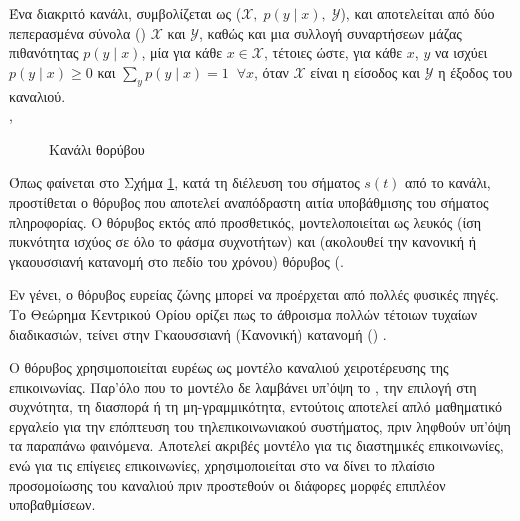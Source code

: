 \begin{definition}
Ένα διακριτό κανάλι, συμβολίζεται ως ($\mathcal{X},\;p(y\mid{x}),\;\mathcal{Y}$), και αποτελείται από δύο πεπερασμένα σύνολα () $\mathcal{X}$ και $\mathcal{Y}$, καθώς και μια συλλογή συναρτήσεων μάζας πιθανότητας $p(y\mid{x})$, μία για κάθε $x\in\mathcal{X}$, τέτοιες ώστε, για κάθε $x$, $y$ να ισχύει $p(y\mid{x})\ge0$ και $\sum\nolimits_{y}p(y\mid{x})=1\;\;\forall{x}$, όταν $\mathcal{X}$ είναι η είσοδος και $\mathcal{Y}$ η έξοδος του καναλιού. \\
\cite{cover2012elements}, \cite{proakis1994communication}
\label{def:discrete channel}
\end{definition}

\begin{figure}[h]
\caption{Κανάλι  θορύβου}
\label{fig:awgn channel}
\end{figure}

Όπως φαίνεται στο Σχήμα \ref{fig:awgn channel}, κατά τη διέλευση του σήματος $s(t)$ από το κανάλι, προστίθεται ο θόρυβος που αποτελεί αναπόδραστη αιτία υποβάθμισης του σήματος πληροφορίας. Ο θόρυβος εκτός από προσθετικός, μοντελοποιείται ως λευκός (ίση πυκνότητα ισχύος σε όλο το φάσμα συχνοτήτων) και  (ακολουθεί την κανονική ή γκαουσσιανή κατανομή στο πεδίο του χρόνου) θόρυβος (.

Εν γένει, ο θόρυβος ευρείας ζώνης μπορεί να προέρχεται από πολλές φυσικές πηγές. Το Θεώρημα Κεντρικού Ορίου ορίζει πως το άθροισμα πολλών τέτοιων τυχαίων διαδικασιών, τείνει στην Γκαουσσιανή (Κανονική) κατανομή () \cite{heyde2006central}.

Ο θόρυβος  χρησιμοποιείται ευρέως ως μοντέλο καναλιού χειροτέρευσης της επικοινωνίας. Παρ'όλο που το μοντέλο δε λαμβάνει υπ'όψη το , την επιλογή στη συχνότητα, τη διασπορά ή τη μη-γραμμικότητα, εντούτοις αποτελεί απλό μαθηματικό εργαλείο για την επόπτευση του τηλεπικοινωνιακού συστήματος, πριν ληφθούν υπ'όψη τα παραπάνω φαινόμενα. Αποτελεί ακριβές μοντέλο για τις διαστημικές επικοινωνίες, ενώ για τις επίγειες επικοινωνίες, χρησιμοποιείται στο να δίνει το πλαίσιο προσομοίωσης του καναλιού πριν προστεθούν οι διάφορες μορφές επιπλέον υποβαθμίσεων.

